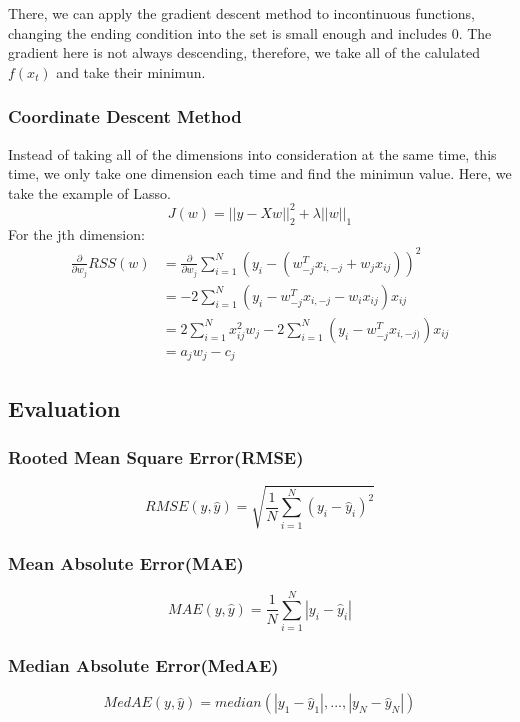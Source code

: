 \documentclass{article}
\begin{document}
	There, we can apply the gradient descent method to incontinuous functions, changing the ending condition into the set is small enough and includes 0. The gradient here is not always descending, therefore, we take all of the calulated $f(x_{t})$ and take their minimun.
	\subsubsection{Coordinate Descent Method}
	Instead of taking all of the dimensions into consideration at the same time, this time, we only take one dimension each time and find the minimun value.
	Here, we take the example of Lasso.
	\begin{displaymath}
		J(w) = ||y - Xw||^2_2 + \lambda ||w||_1
	\end{displaymath}
	For the jth dimension:
	\begin{displaymath}\begin{aligned}
		\frac{\partial}{\partial w_j} RSS(w) 
		&= \frac{\partial}{\partial w_j} \sum_{i=1}^{N}(y_i - (w_{-j}^Tx_{i,-j} + w_jx_{ij}))^2\\
		&= -2\sum_{i=1}^N (y_i - w^T_{-j}x_{i,-j} - w_ix_{ij})x_{ij}\\
		&= 2\sum_{i=1}^N x_{ij}^2w_j - 2\sum_{i=1}^N (y_i - w^T_{-j}x_{i,-j)})x_{ij}\\
		&=a_jw_j - c_j
	\end{aligned}
	\end{displaymath}
\subsection{Evaluation}
	\subsubsection{Rooted Mean Square Error(RMSE)}
	\begin{displaymath}
		RMSE(y,\hat{y}) = \sqrt{\frac{1}{N} \sum_{i=1}^{N}(y_i-\hat{y}_i)^2}
	\end{displaymath}
	\subsubsection{Mean Absolute Error(MAE)}
	\begin{displaymath}
		MAE(y,\hat{y}) = \frac{1}{N} \sum_{i=1}^{N}|y_i-\hat{y}_i|
	\end{displaymath}
	\subsubsection{Median Absolute Error(MedAE)}
	\begin{displaymath}
		MedAE(y,\hat{y}) = median(|y_1-\hat{y}_1|,...,|y_N-\hat{y}_N|)
	\end{displaymath}
\end{document}
